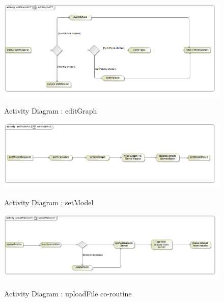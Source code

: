 \documentclass[a4paper,12pt]{article}
\begin{document}
\begin{figure}[H]
		\includegraphics[width=\textwidth]{Images/editGraphACT.png}  \\
		\caption{Activity Diagram : editGraph}
	\end{figure}
	
\begin{figure}[H]
		\includegraphics[width=\textwidth]{Images/setModelACT.png}  \\
		\caption{Activity Diagram : setModel}
	\end{figure}
	
\begin{figure}[H]
		\includegraphics[width=\textwidth]{Images/uploadFileCoACT.png}  \\
		\caption{Activity Diagram :  uploadFile co-routine}
	\end{figure}




\newpage
\end{document}
